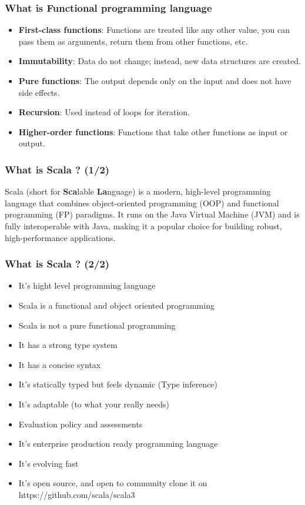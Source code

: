 \documentclass{beamer}
\begin{document}

\begin{frame}
\frametitle{What is Functional programming language}

\begin{itemize}
    \item \textbf{First-class functions}: Functions are treated like any other value, you can pass them as arguments, return them from other functions, etc.
    \item \textbf{Immutability}: Data do not change; instead, new data structures are created.
    \item \textbf{Pure functions}: The output depends only on the input and does not have side effects.
    \item \textbf{Recursion}: Used instead of loops for iteration.
    \item \textbf{Higher-order functions}: Functions that take other functions as input or output.
\end{itemize}
\end{frame}



\begin{frame}
\frametitle{What is Scala ? (1/2) }

Scala (short for \textbf{Sca}lable \textbf{La}nguage) is a modern, high-level programming language that combines object-oriented programming (OOP) and functional programming (FP) paradigms. It runs on the Java Virtual Machine (JVM) and is fully interoperable with Java, making it a popular choice for building robust, high-performance applications.

\end{frame}

\begin{frame}
\frametitle{What is Scala ? (2/2) }

\begin{itemize}
    \item It's hight level programming language
    \item Scala is a functional and object oriented programming
    \item Scala is not a pure functional programming
    \item It has a strong type system
    \item It has a concise syntax
    \item It's statically typed but feels dynamic (Type inference)
    \item It's adaptable (to what your really needs)
    \item Evaluation policy and assessments
    \item It's enterprise production ready programming language
    \item It's evolving fast
    \item It's open source, and open to community clone it on https://github.com/scala/scala3
\end{itemize}
\end{frame}
\end{document}
